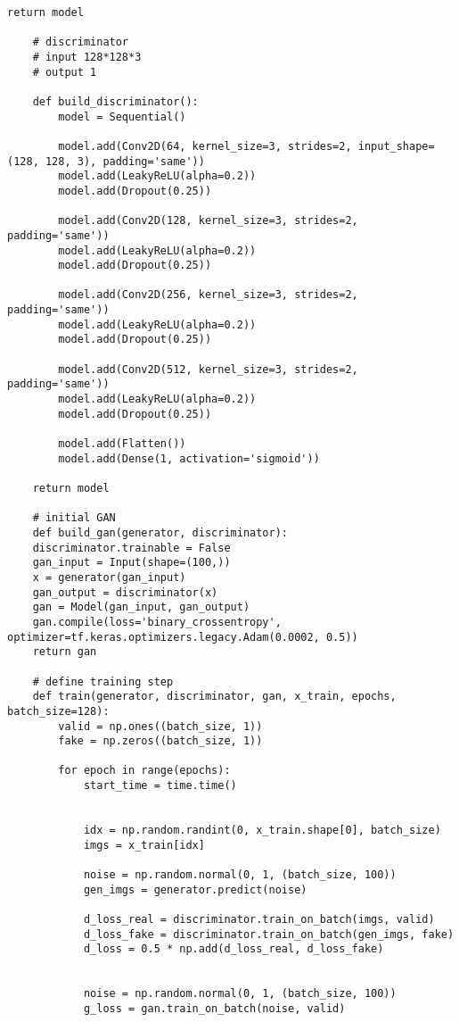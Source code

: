 \begin{lstlisting}[style=mypython, caption=Apply new dataset]
    return model

    # discriminator
    # input 128*128*3
    # output 1

    def build_discriminator():
        model = Sequential()

        model.add(Conv2D(64, kernel_size=3, strides=2, input_shape=(128, 128, 3), padding='same'))
        model.add(LeakyReLU(alpha=0.2))
        model.add(Dropout(0.25))

        model.add(Conv2D(128, kernel_size=3, strides=2, padding='same'))
        model.add(LeakyReLU(alpha=0.2))
        model.add(Dropout(0.25))

        model.add(Conv2D(256, kernel_size=3, strides=2, padding='same'))
        model.add(LeakyReLU(alpha=0.2))
        model.add(Dropout(0.25))

        model.add(Conv2D(512, kernel_size=3, strides=2, padding='same'))
        model.add(LeakyReLU(alpha=0.2))
        model.add(Dropout(0.25))

        model.add(Flatten())
        model.add(Dense(1, activation='sigmoid'))

    return model

    # initial GAN
    def build_gan(generator, discriminator):
    discriminator.trainable = False
    gan_input = Input(shape=(100,))
    x = generator(gan_input)
    gan_output = discriminator(x)
    gan = Model(gan_input, gan_output)
    gan.compile(loss='binary_crossentropy', optimizer=tf.keras.optimizers.legacy.Adam(0.0002, 0.5))
    return gan

    # define training step
    def train(generator, discriminator, gan, x_train, epochs, batch_size=128):
        valid = np.ones((batch_size, 1))
        fake = np.zeros((batch_size, 1))

        for epoch in range(epochs):
            start_time = time.time()


            idx = np.random.randint(0, x_train.shape[0], batch_size)
            imgs = x_train[idx]

            noise = np.random.normal(0, 1, (batch_size, 100))
            gen_imgs = generator.predict(noise)

            d_loss_real = discriminator.train_on_batch(imgs, valid)
            d_loss_fake = discriminator.train_on_batch(gen_imgs, fake)
            d_loss = 0.5 * np.add(d_loss_real, d_loss_fake)


            noise = np.random.normal(0, 1, (batch_size, 100))
            g_loss = gan.train_on_batch(noise, valid)


\end{lstlisting}
